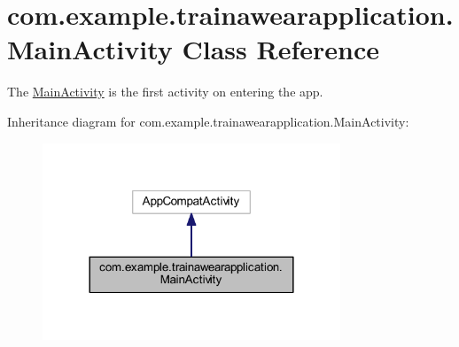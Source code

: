 \hypertarget{classcom_1_1example_1_1trainawearapplication_1_1_main_activity}{}\section{com.\+example.\+trainawearapplication.\+Main\+Activity Class Reference}
\label{classcom_1_1example_1_1trainawearapplication_1_1_main_activity}


The \mbox{\hyperlink{classcom_1_1example_1_1trainawearapplication_1_1_main_activity}{Main\+Activity}} is the first activity on entering the app.  




Inheritance diagram for com.\+example.\+trainawearapplication.\+Main\+Activity\+:
\nopagebreak
\begin{figure}[H]
\begin{center}
\leavevmode
\includegraphics[width=252pt]{classcom_1_1example_1_1trainawearapplication_1_1_main_activity__inherit__graph}
\end{center}
\end{figure}
